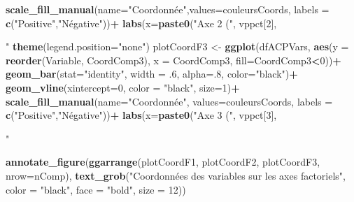 \documentclass[
  11pt,
  french,
]{book}
\makeatletter
\newenvironment{Shaded}{\begin{snugshade}}{\end{snugshade}}
\newcommand{\DataTypeTok}[1]{\textcolor[rgb]{0.13,0.29,0.53}{#1}}
\newcommand{\DecValTok}[1]{\textcolor[rgb]{0.00,0.00,0.81}{#1}}
\newcommand{\FloatTok}[1]{\textcolor[rgb]{0.00,0.00,0.81}{#1}}
\newcommand{\KeywordTok}[1]{\textcolor[rgb]{0.13,0.29,0.53}{\textbf{#1}}}
\newcommand{\NormalTok}[1]{#1}
\newcommand{\OperatorTok}[1]{\textcolor[rgb]{0.81,0.36,0.00}{\textbf{#1}}}
\newcommand{\StringTok}[1]{\textcolor[rgb]{0.31,0.60,0.02}{#1}}
\newenvironment{kframe}{%
\medskip{}
\setlength{\fboxsep}{.8em}
 \def\at@end@of@kframe{}%
 \ifinner\ifhmode%
  \def\at@end@of@kframe{\end{minipage}}%
  \begin{minipage}{\columnwidth}%
 \fi\fi%
 \def\FrameCommand##1{\hskip\@totalleftmargin \hskip-\fboxsep
 \colorbox{shadecolor}{##1}\hskip-\fboxsep
     \hskip-\linewidth \hskip-\@totalleftmargin \hskip\columnwidth}%
 \MakeFramed {\advance\hsize-\width
   \@totalleftmargin\z@ \linewidth\hsize
   \@setminipage}}%
 {\par\unskip\endMakeFramed%
 \at@end@of@kframe}
\renewenvironment{Shaded}{\begin{kframe}}{\end{kframe}}
\makeatother
\begin{document}
\begin{Shaded}
\begin{Highlighting}[]
{\StringTok{  }\KeywordTok{scale_fill_manual}\NormalTok{(}\DataTypeTok{name=}\StringTok{"Coordonnée"}\NormalTok{,}\DataTypeTok{values=}\NormalTok{couleursCoords,}
                    \DataTypeTok{labels =} \KeywordTok{c}\NormalTok{(}\StringTok{"Positive"}\NormalTok{,}\StringTok{"Négative"}\NormalTok{))}\OperatorTok{+}
\StringTok{  }\KeywordTok{labs}\NormalTok{(}\DataTypeTok{x=}\KeywordTok{paste0}\NormalTok{(}\StringTok{"Axe 2 ("}\NormalTok{, vppct[}\DecValTok{2}\NormalTok{],}\StringTok{"%
\StringTok{  }\KeywordTok{theme}\NormalTok{(}\DataTypeTok{legend.position=}\StringTok{"none"}\NormalTok{)}
\NormalTok{plotCoordF3 <-}\StringTok{ }\KeywordTok{ggplot}\NormalTok{(dfACPVars,}
                      \KeywordTok{aes}\NormalTok{(}\DataTypeTok{y =} \KeywordTok{reorder}\NormalTok{(Variable, CoordComp3),}
                          \DataTypeTok{x =}\NormalTok{ CoordComp3, }\DataTypeTok{fill=}\NormalTok{CoordComp3}\OperatorTok{<}\DecValTok{0}\NormalTok{))}\OperatorTok{+}
\StringTok{  }\KeywordTok{geom_bar}\NormalTok{(}\DataTypeTok{stat=}\StringTok{"identity"}\NormalTok{, }\DataTypeTok{width =} \FloatTok{.6}\NormalTok{, }\DataTypeTok{alpha=}\NormalTok{.}\DecValTok{8}\NormalTok{, }\DataTypeTok{color=}\StringTok{"black"}\NormalTok{)}\OperatorTok{+}
\StringTok{  }\KeywordTok{geom_vline}\NormalTok{(}\DataTypeTok{xintercept=}\DecValTok{0}\NormalTok{, }\DataTypeTok{color =} \StringTok{"black"}\NormalTok{, }\DataTypeTok{size=}\DecValTok{1}\NormalTok{)}\OperatorTok{+}
\StringTok{  }\KeywordTok{scale_fill_manual}\NormalTok{(}\DataTypeTok{name=}\StringTok{"Coordonnée"}\NormalTok{, }\DataTypeTok{values=}\NormalTok{couleursCoords,}
                    \DataTypeTok{labels =} \KeywordTok{c}\NormalTok{(}\StringTok{"Positive"}\NormalTok{,}\StringTok{"Négative"}\NormalTok{))}\OperatorTok{+}
\StringTok{  }\KeywordTok{labs}\NormalTok{(}\DataTypeTok{x=}\KeywordTok{paste0}\NormalTok{(}\StringTok{"Axe 3 ("}\NormalTok{, vppct[}\DecValTok{3}\NormalTok{],}\StringTok{"%

\KeywordTok{annotate_figure}\NormalTok{(}\KeywordTok{ggarrange}\NormalTok{(plotCoordF1, plotCoordF2, plotCoordF3, }\DataTypeTok{nrow=}\NormalTok{nComp),}
                \KeywordTok{text_grob}\NormalTok{(}\StringTok{"Coordonnées des variables sur les axes factoriels"}\NormalTok{,}
                          \DataTypeTok{color =} \StringTok{"black"}\NormalTok{, }\DataTypeTok{face =} \StringTok{"bold"}\NormalTok{, }\DataTypeTok{size =} \DecValTok{12}\NormalTok{))}

}}}
\end{Highlighting}
\end{Shaded}
\end{document}
